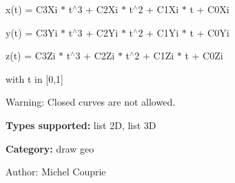 x(t) = C3Xi $\ast$ t$^\wedge$3 + C2Xi $\ast$ t$^\wedge$2 + C1Xi $\ast$ t + C0Xi\par
 y(t) = C3Yi $\ast$ t$^\wedge$3 + C2Yi $\ast$ t$^\wedge$2 + C1Yi $\ast$ t + C0Yi\par
 z(t) = C3Zi $\ast$ t$^\wedge$3 + C2Zi $\ast$ t$^\wedge$2 + C1Zi $\ast$ t + C0Zi\par
 with t in [0,1]

\begin{Desc}
\item[Warning:]Closed curves are not allowed.\end{Desc}
{\bf Types supported:} list 2D, list 3D

{\bf Category:} draw geo

\begin{Desc}
\item[Author:]Michel Couprie \end{Desc}
